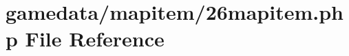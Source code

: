 \hypertarget{26mapitem_8php}{\section{gamedata/mapitem/26mapitem.php File Reference}
\label{26mapitem_8php}
}
